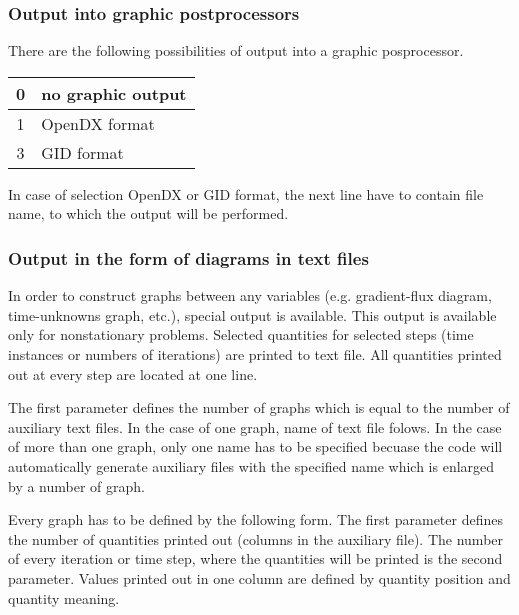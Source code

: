 \subsubsection{Output into graphic postprocessors}
There are the following possibilities of output into a graphic posprocessor.

\begin{center}
\begin{tabular}{|c|l|}
\hline
 0 & no graphic output
\\ \hline
 1 & OpenDX format
\\ \hline
 3 & GID format
\\ \hline
\end{tabular}
\end{center}

In case of selection OpenDX or GID format, the next line have to contain file name,
to which the output will be performed.


\subsubsection{Output in the form of diagrams in text files}

In order to construct graphs between any variables (e.g. gradient-flux diagram,
time-unknowns graph, etc.), special output is available.
This output is available only for nonstationary problems. 
Selected quantities for selected steps (time instances or numbers of iterations)
are printed to text file. All quantities printed out at every step are located at one line.

The first parameter defines the number of graphs which is equal to the number of auxiliary
text files. In the case of one graph, name of text file folows. In the case of more than one graph,
only one name has to be specified becuase the code will automatically generate auxiliary files
with the specified name which is enlarged by a number of graph.

Every graph has to be defined by the following form.
The first parameter defines the number of quantities printed out (columns in the auxiliary file).
The number of every iteration or time step, where the quantities will be printed is
the second parameter.
Values printed out in one column are defined by quantity position and quantity meaning.

